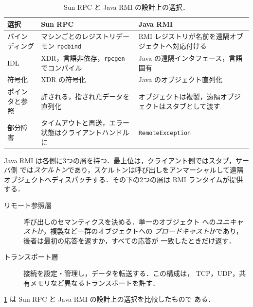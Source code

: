\documentclass[../main.tex]{subfiles}
\begin{document}
\begin{table}[htbp]
  \centering
  \caption{Sun RPC と Java RMI の設計上の選択．}
  \label{tab:l13-design}
  \small
  \begin{tabular}{@{}>{\raggedright}p{24mm}>{\raggedright}p{44mm}%
      >{\raggedright\arraybackslash}p{44mm}@{}}
    \toprule
    選択 & Sun RPC & Java RMI \\
    \midrule
    バインディング & マシンごとのレジストリデーモン \texttt{rpcbind}
      & RMI レジストリが名前を遠隔オブジェクトへ対応付ける \\
    \addlinespace
    IDL & XDR，言語非依存，\texttt{rpcgen} でコンパイル
      & Java の遠隔インタフェース，言語固有 \\
    \addlinespace
    符号化 & XDR の符号化 & Java のオブジェクト直列化 \\
    \addlinespace
    ポインタと参照 & 許される，指されたデータを直列化
      & オブジェクトは複製，遠隔オブジェクトはスタブとして渡す \\
    \addlinespace
    部分障害 & タイムアウトと再送，エラー状態はクライアントハンドルに
      & \texttt{RemoteException} \\
    \bottomrule
  \end{tabular}
\end{table}

Java RMI は各側に3つの層を持つ．最上位は，クライアント側ではスタブ，サーバ側
では\emph{スケルトン}であり，スケルトンは呼び出しをアンマーシャルして遠隔
オブジェクトへディスパッチする．その下の2つの層は
RMI ランタイムが提供する．
\begin{description}
  \item[リモート参照層] 呼び出しのセマンティクスを決める．単一のオブジェクト
    への\emph{ユニキャスト}か，複製など一群のオブジェクトへの
    \emph{ブロードキャスト}かであり，後者は最初の応答を返すか，すべての応答が
    一致したときだけ返す．
  \item[トランスポート層] 接続を設定・管理し，データを転送する．この構成は，
    TCP，UDP，共有メモリなど異なるトランスポートを許す．
\end{description}
\cref{tab:l13-design} は Sun RPC と Java RMI の設計上の選択を比較したもので
ある．
\end{document}
